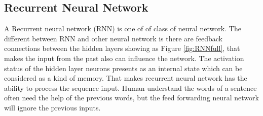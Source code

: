 \subsection{Recurrent Neural Network} %

A Recurrent neural network (RNN) is one of of class of neural network. The different between RNN and other neural network is there are feedback connections between the hidden layers showing as Figure \ref{fig:RNNfull}, that makes the input from the past also can influence the network. The activation status of the hidden layer neurons presents as an internal state which can be considered as a kind of memory. That makes recurrent neural network has the ability to process the sequence input. Human understand the words of a sentence often need the help of the previous words, but the feed forwarding neural network will ignore the previous inputs.


